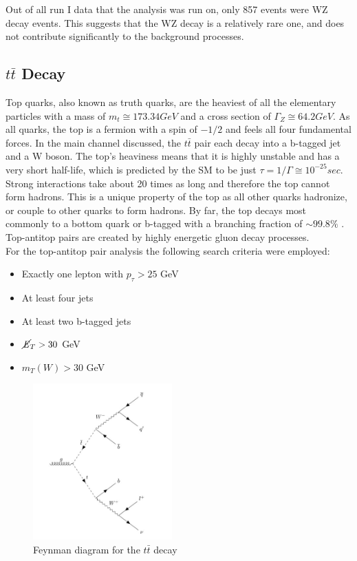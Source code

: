 \documentclass[runningheads,a4paper]{llncs}
\begin{document}
Out of all run I data that the analysis was run on, only 857 events were WZ decay events. This suggests that the WZ decay is a relatively rare one, and does not contribute significantly to the background processes. \\


\subsection{$t \bar{t}$ Decay}
Top quarks, also known as truth quarks, are the heaviest of all the elementary particles with a mass of ${m}_{t}\cong 173.34GeV$ and a cross section of $\Gamma_Z \cong 64.2 GeV$. \cite{abazov2008simultaneous} As all quarks, the top is a fermion with a spin of $-{1/2}$ and feels all four fundamental forces. In the main channel discussed, the $t\bar{t}$ pair each decay into a b-tagged jet and a W boson. The top's heaviness means that it is highly unstable and has a very short half-life, which is predicted by the SM to be just $\tau = 1/\Gamma\cong{ 10 }^{ -25 }sec$. Strong interactions take about 20 times as long and therefore the top cannot form hadrons. This is a unique property of the top as all other quarks hadronize, or couple to other quarks to form hadrons. By far, the top decays most commonly to a bottom quark or b-tagged with a branching fraction of $\sim99.8\%$ \cite{Agashe:2014kda}. Top-antitop pairs are created by highly energetic gluon decay processes.\\

For the top-antitop pair analysis the following search criteria were employed:
\begin{itemize}
\item Exactly one lepton with $p_\tau > 25$ GeV
\item At least four jets
\item At least two b-tagged jets
\item $\cancel{\it{E}}_{T} > 30$ GeV
\item ${m}_{T}(W) > 30$ GeV
\end{itemize}

\begin{figure}
\centering
\includegraphics[height=6cm]{feynm_ttbar}
\caption{Feynman diagram for the $t \bar{t}$ decay}
\label{fig:feynmtop}
\end{figure}
\end{document}
